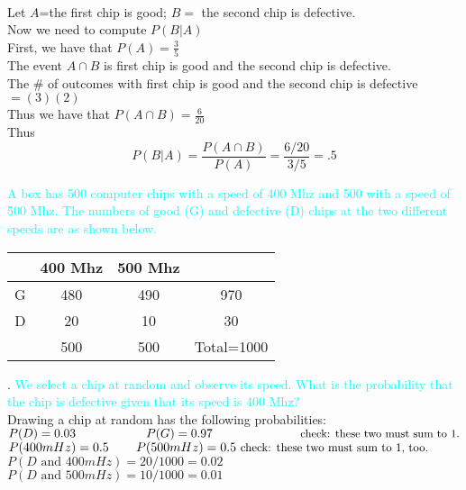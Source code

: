 \documentclass[20pt,landscape]{foils}
\newcommand{\no}{\noindent}
\newcommand \h {\hspace*{.3in}}
\begin{document}
{{\foilhead[-.7in]{\textcolor{blue}{Conditional Probability (continued)}}
\no {\textcolor{cyan}{Compute the probability that the second chip is defective given that the first chip is good using the above definition.}}\\[.1in] 
\no Let  $A$=the first chip is good; $B=$ the second chip is defective.\\[.1in]
Now we need to compute $P(B|A)$\\[.15in] 
\no First, we have that $P(A)=\frac{3}{5}$ \\[.15in] 
\no The event $ A\cap B$  is  first chip is good and the second chip is defective.\\[.1in] 
\no The \# of outcomes with first chip is good and the second chip is defective $= (3)(2)$\\[.1in]
\no Thus we have that $P(A\cap B)=\frac{6}{20}$\\[.1in]
\no Thus $$P(B|A) =\frac{P(A\cap B)}{P(A)}=\frac{6/20}{3/5}=.5$$

\foilhead[-.8in]{\textcolor{blue}{ More computer chips...}}
\no {\textcolor{magenta}{Example 2:}}  {\textcolor{cyan}{A box has 500 computer chips with a speed of 400 Mhz and 500 with a speed of 500 Mhz. The numbers of good (G) and defective (D) chips at the two different speeds are as shown below.}} 
\begin{center}{\small
\begin{tabular}{c|c|c|c}
& 400 Mhz & 500 Mhz & \\[.01in]
\hline 
G & 480 & 490 & 970  \\[.01in]
\hline
D & 20 & 10 & 30   \\[.01in] 
\hline
& 500 & 500 & Total=1000    
\end{tabular}}
\end{center}
\no 1. {\textcolor{cyan}{We select a chip at random and observe its speed. What is the probability that the chip is defective given that its speed is 400 Mhz?}}\\[.01in] 
Drawing a chip at random has the following probabilities:\\[.1in] 
\h \h	$P(D) = 0.03 \hspace*{.8in} P(G) = 0.97 \hspace*{1in} \text{\small check: these two must sum to 1.}$\\[.01in] 
\h \h	$P(400 mHz) = 0.5  \hspace*{.3in}  P(500 mHz) = 0.5 \ \text{\small check: these two must sum to 1, too.}$\\[.1in]
\h \h \h $P( D \text{ and } 400 mHz) = 20/1000 = 0.02$ \\[.01in]
\h \h \h $P( D \text{ and } 500 mHz) = 10/1000 = 0.01$ 

}}
\end{document}
